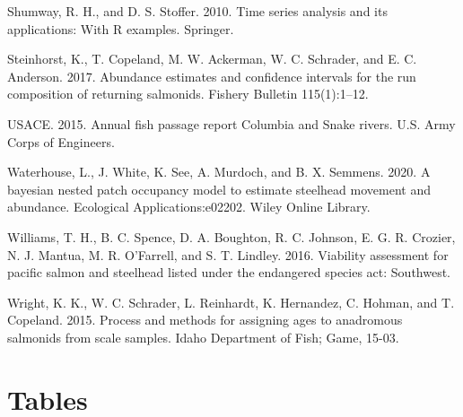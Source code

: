 \documentclass[
  12pt,
]{article}
\begin{document}
\leavevmode\hypertarget{ref-Shumway2010}{}%
Shumway, R. H., and D. S. Stoffer. 2010. Time series analysis and its applications: With R examples. Springer.

\leavevmode\hypertarget{ref-Steinhorst2017}{}%
Steinhorst, K., T. Copeland, M. W. Ackerman, W. C. Schrader, and E. C. Anderson. 2017. Abundance estimates and confidence intervals for the run composition of returning salmonids. Fishery Bulletin 115(1):1--12.

\leavevmode\hypertarget{ref-USACE2015}{}%
USACE. 2015. Annual fish passage report Columbia and Snake rivers. U.S. Army Corps of Engineers.

\leavevmode\hypertarget{ref-waterhouse2020bayesian}{}%
Waterhouse, L., J. White, K. See, A. Murdoch, and B. X. Semmens. 2020. A bayesian nested patch occupancy model to estimate steelhead movement and abundance. Ecological Applications:e02202. Wiley Online Library.

\leavevmode\hypertarget{ref-williams2016viability}{}%
Williams, T. H., B. C. Spence, D. A. Boughton, R. C. Johnson, E. G. R. Crozier, N. J. Mantua, M. R. O'Farrell, and S. T. Lindley. 2016. Viability assessment for pacific salmon and steelhead listed under the endangered species act: Southwest.

\leavevmode\hypertarget{ref-Wright2015}{}%
Wright, K. K., W. C. Schrader, L. Reinhardt, K. Hernandez, C. Hohman, and T. Copeland. 2015. Process and methods for assigning ages to anadromous salmonids from scale samples. Idaho Department of Fish; Game, 15-03.

\newpage

\hypertarget{tables}{%
\section{Tables}\label{tables}}
\end{document}
